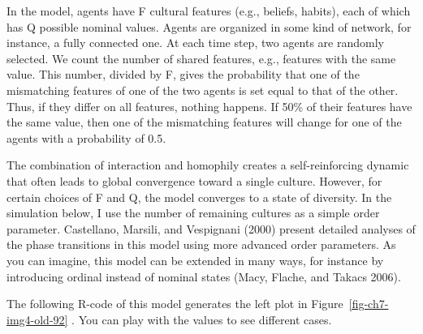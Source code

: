 \documentclass[
  a4paper,
  DIV=11,
  numbers=noendperiod,
  oneside]{scrreprt}
\begin{document}
In the model, agents have F cultural features (e.g., beliefs, habits),
each of which has Q possible nominal values. Agents are organized in
some kind of network, for instance, a fully connected one. At each time
step, two agents are randomly selected. We count the number of shared
features, e.g., features with the same value. This number, divided by F,
gives the probability that one of the mismatching features of one of the
two agents is set equal to that of the other. Thus, if they differ on
all features, nothing happens. If 50\% of their features have the same
value, then one of the mismatching features will change for one of the
agents with a probability of 0.5.

The combination of interaction and homophily creates a self-reinforcing
dynamic that often leads to global convergence toward a single culture.
However, for certain choices of F and Q, the model converges to a state
of diversity. In the simulation below, I use the number of remaining
cultures as a simple order parameter. Castellano, Marsili, and
Vespignani (2000) present detailed analyses of the phase transitions in
this model using more advanced order parameters. As you can imagine,
this model can be extended in many ways, for instance by introducing
ordinal instead of nominal states (Macy, Flache, and Takacs 2006).

The following R-code of this model generates the left plot in
Figure~\ref{fig-ch7-img4-old-92} . You can play with the values to see
different cases.
\end{document}
